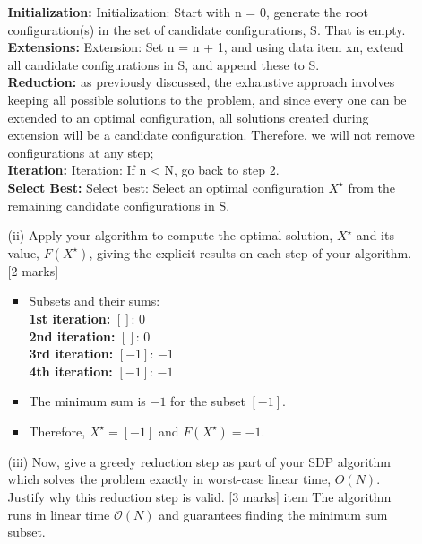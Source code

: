 \begin{enumerate}
\begin{enumerate}
    {\color{blue}
        \textbf{Initialization:} 
        Initialization: Start with n = 0, generate the root configuration(s) in the set of candidate configurations, S. That is empty. \\
        \textbf{Extensions:}
        Extension: Set n = n + 1, and using data item xn, extend all candidate configurations in S, and append these to S. \\
        \textbf{Reduction:} as previously discussed, the exhaustive approach involves keeping all
possible solutions to the problem, and since every one can be extended to an optimal
configuration, all solutions created during extension will be a candidate configuration.
Therefore, we will not remove configurations at any step; \\
        \textbf{Iteration:} Iteration: If n < N, go back to step 2. \\
        \textbf{Select Best:} Select best: Select an optimal configuration $X^\star$ from the remaining candidate configurations
in S. \\
    }
        \item[(ii)] Apply your algorithm to compute the optimal solution, $X^\star$ and its value, $F(X^\star)$, giving the explicit results on each step of your algorithm. [2 marks]
        {\color{blue}
            \begin{itemize}
                \item Subsets and their sums: \\
                    \textbf{1st iteration:} $[]$: $0$ \\
                    \textbf{2nd iteration:} $[]$: $0$ \\
                    \textbf{3rd iteration:} $[-1]$: $-1$ \\
                    \textbf{4th iteration:} $[-1]$: $-1$ \\
                \item The minimum sum is $-1$ for the subset $[-1]$.
                \item Therefore, $X^\star = [-1]$ and $F(X^\star) = -1$.
            \end{itemize}
        }
        \item[(iii)] Now, give a greedy reduction step as part of your SDP algorithm which solves the problem exactly in worst-case linear time, $O(N)$. Justify why this reduction step is valid. [3 marks]
        {\color{blue}
            item The algorithm runs in linear time $\mathcal{O}(N)$ and guarantees finding the minimum sum subset. \\
        }
    \end{enumerate}
\end{enumerate}

